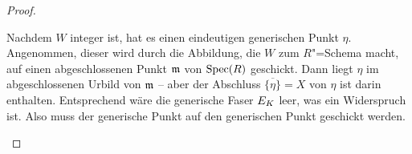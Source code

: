 \begin{Lemma}
\begin{proof}
\begin{description}
      Nachdem $W$ integer ist, hat es einen eindeutigen generischen
      Punkt $\eta$.
      Angenommen, dieser wird durch die Abbildung, die $W$ zum
      $R$"=Schema macht, auf einen abgeschlossenen Punkt $\mathfrak{m}$ von $\operatorname{Spec}(R)$
      geschickt.
      Dann liegt $\eta$ im abgeschlossenen Urbild von $\mathfrak{m}$ –
      aber der Abschluss $\overline{\{\eta\}}=X$ von $\eta$ ist darin
      enthalten. Entsprechend wäre die generische Faser $E_{K}$
      leer, was ein Widerspruch ist.
      Also muss der generische Punkt auf den generischen Punkt geschickt
      werden.
      \qedhere
    \end{description}
  \end{proof}
\end{Lemma}





